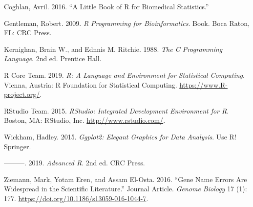 \documentclass[]{book}
\begin{document}
\hypertarget{refs}{}
\leavevmode\hypertarget{ref-Coghlan:2016}{}%
Coghlan, Avril. 2016. ``A Little Book of R for Biomedical Statistics.''

\leavevmode\hypertarget{ref-Gentleman2009R-Programming-Bioinfo}{}%
Gentleman, Robert. 2009. \emph{R Programming for Bioinformatics}. Book. Boca Raton, FL: CRC Press.

\leavevmode\hypertarget{ref-Kernighan1988The-C-Programming-La}{}%
Kernighan, Brain W., and Ednnis M. Ritchie. 1988. \emph{The C Programming Language}. 2nd ed. Prentice Hall.

\leavevmode\hypertarget{ref-R-base}{}%
R Core Team. 2019. \emph{R: A Language and Environment for Statistical Computing}. Vienna, Austria: R Foundation for Statistical Computing. \url{https://www.R-project.org/}.

\leavevmode\hypertarget{ref-R-rstudio}{}%
RStudio Team. 2015. \emph{RStudio: Integrated Development Environment for R}. Boston, MA: RStudio, Inc. \url{http://www.rstudio.com/}.

\leavevmode\hypertarget{ref-Wickham2015ggplot2-Elegant-Gra}{}%
Wickham, Hadley. 2015. \emph{Ggplot2: Elegant Graphics for Data Analysis}. Use R! Springer.

\leavevmode\hypertarget{ref-Wickham:2019}{}%
---------. 2019. \emph{Advanced R}. 2nd ed. CRC Press.

\leavevmode\hypertarget{ref-Ziemann2016Gene-name-errors}{}%
Ziemann, Mark, Yotam Eren, and Assam El-Osta. 2016. ``Gene Name Errors Are Widespread in the Scientific Literature.'' Journal Article. \emph{Genome Biology} 17 (1): 177. \url{https://doi.org/10.1186/s13059-016-1044-7}.
\end{document}
